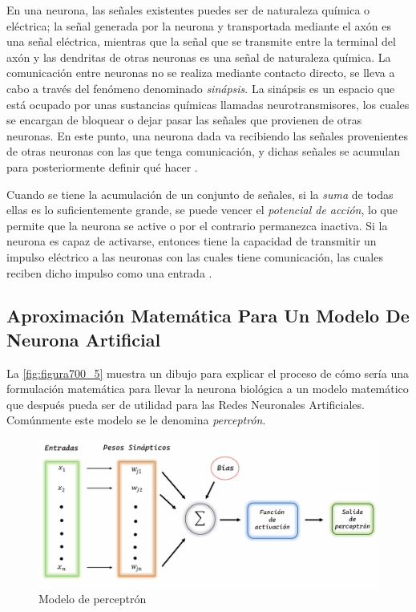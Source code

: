 {En una neurona, las señales existentes puedes ser de naturaleza química o eléctrica; la señal generada por la neurona y transportada mediante el axón es una señal eléctrica, mientras que la señal que se transmite entre la 
terminal del axón y las dendritas de otras neuronas es una señal de naturaleza química. La comunicación entre neuronas no se realiza mediante contacto directo, se lleva a cabo a través del fenómeno denominado \textit{sinápsis}.
La sinápsis es un espacio que está ocupado por unas sustancias químicas llamadas neurotransmisores, los cuales se encargan de bloquear o dejar pasar las señales que provienen de otras neuronas. En este punto, una neurona 
dada va recibiendo las señales provenientes de otras neuronas con las que tenga comunicación, y dichas señales se acumulan para posteriormente definir qué hacer \cite{caicedoANN}.

Cuando se tiene la acumulación de un conjunto de señales, si la \textit{suma} de todas ellas es lo suficientemente grande, se puede vencer el \textit{potencial de acción}, lo que permite que la neurona se active o por el 
contrario permanezca inactiva. Si la neurona es capaz de activarse, entonces tiene la capacidad de transmitir un impulso eléctrico a las neuronas con las cuales tiene comunicación, las cuales reciben dicho impulso como una 
entrada \cite{caicedoANN}.

\subsection{Aproximación Matemática Para Un Modelo De Neurona Artificial}

La \autoref{fig:figura700_5} muestra un dibujo para explicar el proceso de cómo sería una formulación matemática para llevar la neurona biológica a un modelo matemático que después pueda ser de utilidad para las Redes Neuronales 
Artificiales. Comúnmente este modelo se le denomina \textit{perceptrón}.

\begin{figure}[h]
	\centering
	\includegraphics[scale=0.55]{imgss219.png}
	\caption{Modelo de perceptrón}
	\label{fig:figura700_5}
\end{figure}

}
